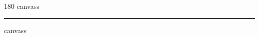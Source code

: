 
\begin{frame}
\begin{center}
\begin{turn}{180}
{\fontsize{2.5cm}{1em}\selectfont canvass}
\end{turn}
\vspace{1em}\par  
\hrule
\vspace{1em}\par  
{\fontsize{2.5cm}{1em}\selectfont canvass}
\end{center}
\end{frame}
